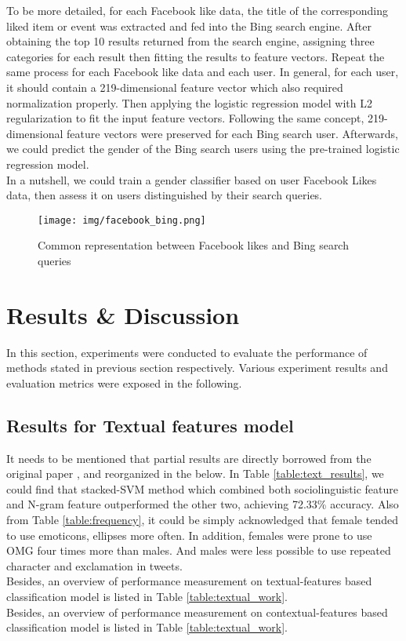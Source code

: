 \documentclass[runningheads]{llncs}
\begin{document}
	To be more detailed, for each Facebook like data, the title of the corresponding liked item or event was extracted and fed into the Bing search engine. After obtaining the top 10 results returned from the search engine, assigning three categories for each result then fitting the results to feature vectors. Repeat the same process for each Facebook like data and each user. In general, for each user, it should contain a 219-dimensional feature vector which also required normalization properly. Then applying the logistic regression model with L2 regularization to fit the input feature vectors. Following the same concept, 219-dimensional feature vectors were preserved for each Bing search user. Afterwards, we could predict the gender of the Bing search users using the pre-trained logistic regression model. \\

	In a nutshell, we could train a gender classifier based on user Facebook Likes data, then assess it on users distinguished by their search queries.  \\
	
	\begin{figure}
		\centering
		\texttt{[image: img/facebook\_bing.png]}
		\caption{Common representation between Facebook likes and Bing search queries}
		\label{fig:facebook_bing}
	\end{figure}
	
	\section{Results \& Discussion}
	In this section, experiments were conducted to evaluate the performance of methods stated in previous section respectively. Various experiment results and evaluation metrics were exposed in the following.
	
	\subsection{Results for Textual features model}
	
	It needs to be mentioned that partial results are directly borrowed from the original paper \cite{rao2010classifying}, and reorganized in the below. In Table \ref{table:text_results}, we could find that stacked-SVM method which combined both sociolinguistic feature and N-gram feature outperformed the other two, achieving 72.33\% accuracy. Also from Table  \ref{table:frequency}, it could be simply acknowledged that female tended to use emoticons, ellipses more often. In addition, females were prone to use OMG four times more than males. And males were less possible to use repeated character and exclamation in tweets.  
	\\
	Besides, an overview of performance measurement on textual-features based classification model is listed in Table \ref{table:textual_work}.  
	\\
	Besides, an overview of performance measurement on contextual-features based classification model is listed in Table \ref{table:textual_work}. 
	
\end{document}
